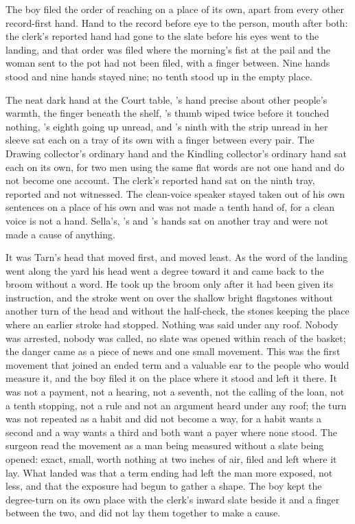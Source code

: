 The boy filed the order of reaching on a place of its own, apart from every other record-first hand. Hand to the record before eye to the person, mouth after both: the clerk's reported hand had gone to the slate before his eyes went to the landing, and that order was filed where the morning's fist at the pail and the woman sent to the pot had not been filed, with a finger between. Nine hands stood and nine hands stayed nine; no tenth stood up in the empty place.

The neat dark hand at the Court table, 's hand precise about other people's warmth, the finger beneath the shelf, 's thumb wiped twice before it touched nothing, 's eighth going up unread, and 's ninth with the strip unread in her sleeve sat each on a tray of its own with a finger between every pair. The Drawing collector's ordinary hand and the Kindling collector's ordinary hand sat each on its own, for two men using the same flat words are not one hand and do not become one account. The clerk's reported hand sat on the ninth tray, reported and not witnessed. The clean-voice speaker stayed taken out of his own sentences on a place of his own and was not made a tenth hand of, for a clean voice is not a hand. Sella's, 's and 's hands sat on another tray and were not made a cause of anything.

\scenebreak

It was Tarn's head that moved first, and moved least. As the word of the landing went along the yard his head went a degree toward it and came back to the broom without a word. He took up the broom only after it had been given its instruction, and the stroke went on over the shallow bright flagstones without another turn of the head and without the half-check, the stones keeping the place where an earlier stroke had stopped. Nothing was said under any roof. Nobody was arrested, nobody was called, no slate was opened within reach of the basket; the danger came as a piece of news and one small movement. This was the first movement that joined an ended term and a valuable ear to the people who would measure it, and the boy filed it on the place where it stood and left it there. It was not a payment, not a hearing, not a seventh, not the calling of the loan, not a tenth stopping, not a rule and not an argument heard under any roof; the turn was not repeated as a habit and did not become a way, for a habit wants a second and a way wants a third and both want a payer where none stood. The surgeon read the movement as a man being measured without a slate being opened: exact, small, worth nothing at two inches of air, filed and left where it lay. What landed was that a term ending had left the man more exposed, not less, and that the exposure had begun to gather a shape. The boy kept the degree-turn on its own place with the clerk's inward slate beside it and a finger between the two, and did not lay them together to make a cause.


